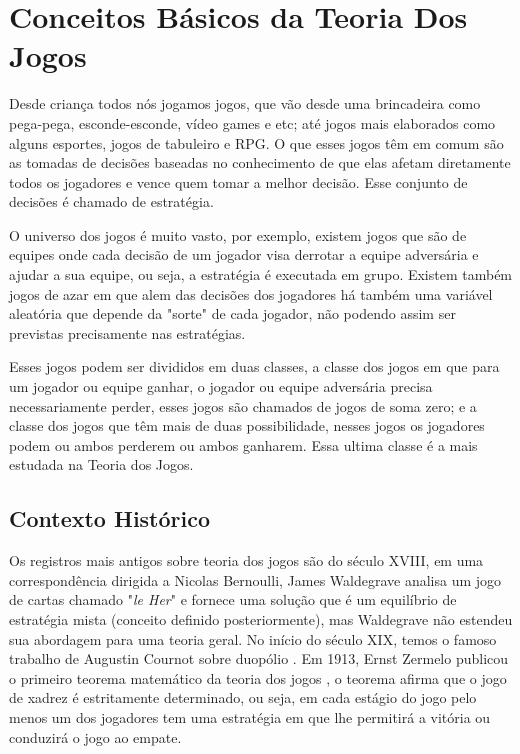 %

\chapter{Conceitos Básicos da Teoria Dos Jogos}

Desde criança todos nós jogamos jogos, que vão desde uma brincadeira como pega-pega, esconde-esconde, vídeo games e etc; até jogos mais elaborados como alguns esportes, jogos de tabuleiro e RPG. O que esses jogos têm em comum são as tomadas de decisões baseadas no conhecimento de que elas afetam diretamente todos os jogadores e vence quem tomar a melhor decisão. Esse conjunto de decisões é chamado de estratégia.

O universo dos jogos é muito vasto, por exemplo, existem jogos que são de equipes onde cada decisão de um jogador visa derrotar a equipe adversária e ajudar a sua equipe, ou seja, a estratégia é executada em grupo. Existem também jogos de azar em que alem das decisões dos jogadores há também uma variável aleatória que depende da "sorte" de cada jogador, não podendo assim ser previstas precisamente nas estratégias. 

Esses jogos podem ser divididos em duas classes, a classe dos jogos em que para um jogador ou equipe ganhar, o jogador ou equipe adversária precisa necessariamente perder, esses jogos são chamados de jogos de soma zero; e a classe dos jogos que têm mais de duas possibilidade, nesses jogos os jogadores podem ou ambos perderem ou ambos ganharem. Essa ultima classe é a mais estudada na Teoria dos Jogos.

\section{Contexto Histórico}

Os registros mais antigos sobre teoria dos jogos são do século XVIII, em uma correspondência dirigida a Nicolas Bernoulli, James Waldegrave analisa um jogo de cartas chamado "\textit{le Her}" e fornece uma solução que é um equilíbrio de estratégia mista (conceito definido posteriormente), mas Waldegrave não estendeu sua abordagem para uma teoria geral. No início do século XIX, temos o famoso trabalho de Augustin Cournot sobre duopólio \cite{COURNOT}. Em 1913, Ernst Zermelo publicou o primeiro teorema matemático da teoria dos jogos \cite{ZERMELO}, o teorema afirma que o jogo de xadrez é estritamente determinado, ou seja, em cada estágio do jogo pelo menos um dos jogadores tem uma estratégia em que lhe permitirá a vitória ou conduzirá o jogo ao empate.

